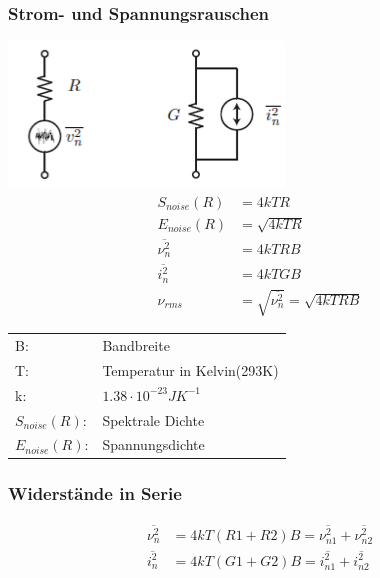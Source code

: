 \subsubsection{Strom- und Spannungsrauschen}
\begin{multicols}{3}
	\includegraphics[scale=0.5]{pictures/widerstandrauschen}
	\columnbreak
	\begin{align*}
		S_{noise}(R) &=4kTR\\
		E_{noise}(R) &=\sqrt{4kTR}\\
		\overline{\nu^2_{n}} &=4kTRB\\
		\overline{i^2_{n}} &=4kTGB\\
		\nu_{rms} &= \sqrt{\overline{\nu^2_{n}}} = \sqrt{4kTRB}
	\end{align*}
	\begin{tabular}{ll}
		B:&Bandbreite\\
		T:&Temperatur in Kelvin(293K)\\
		k:&$1.38 \cdot 10^{-23}JK^{-1}$\\
		$S_{noise}(R)$:&Spektrale Dichte\\
		$E_{noise}(R)$:&Spannungsdichte
	\end{tabular}
\end{multicols}

\subsubsection{Widerstände in Serie}
\begin{minipage}{0.4\textwidth}
	\begin{center}
		
	\end{center}
\end{minipage}
\begin{minipage}{0.6\textwidth}
	\begin{align*}
		\overline{\nu^2_{n}}&=4kT(R1+R2)B=\overline{\nu^2_{n1}}+\overline{\nu^2_{n2}}\\
		\overline{i^2_{n}}&=4kT(G1+G2)B=\overline{i^2_{n1}}+\overline{i^2_{n2}}
	\end{align*}
\end{minipage}

